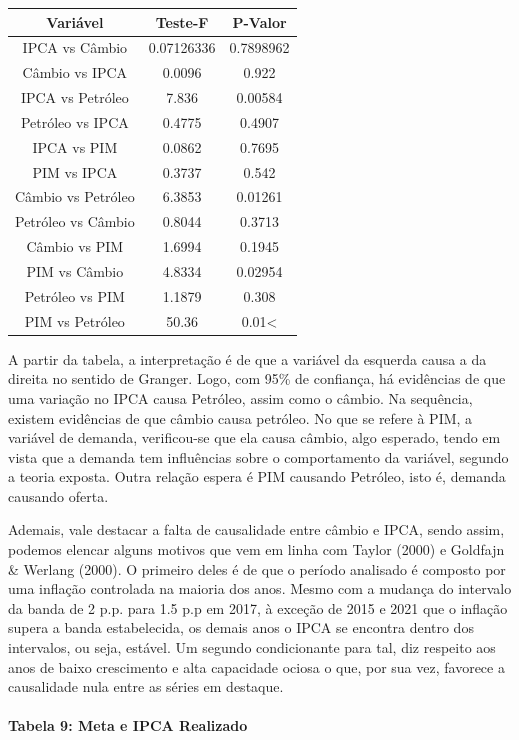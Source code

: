 \documentclass[12pt]{article}
\begin{document}
\begin{longtable}[]{@{}ccc@{}}
\toprule
Variável & Teste-F & P-Valor \\
\midrule
\endhead
IPCA vs Câmbio & 0.07126336 & 0.7898962 \\
Câmbio vs IPCA & 0.0096 & 0.922 \\
IPCA vs Petróleo & 7.836 & 0.00584 \\
Petróleo vs IPCA & 0.4775 & 0.4907 \\
IPCA vs PIM & 0.0862 & 0.7695 \\
PIM vs IPCA & 0.3737 & 0.542 \\
Câmbio vs Petróleo & 6.3853 & 0.01261 \\
Petróleo vs Câmbio & 0.8044 & 0.3713 \\
Câmbio vs PIM & 1.6994 & 0.1945 \\
PIM vs Câmbio & 4.8334 & 0.02954 \\
Petróleo vs PIM & 1.1879 & 0.308 \\
PIM vs Petróleo & 50.36 & 0.01\textless{} \\
\bottomrule
\end{longtable}

A partir da tabela, a interpretação é de que a variável da esquerda
causa a da direita no sentido de Granger. Logo, com 95\% de confiança,
há evidências de que uma variação no IPCA causa Petróleo, assim como o
câmbio. Na sequência, existem evidências de que câmbio causa petróleo.
No que se refere à PIM, a variável de demanda, verificou-se que ela
causa câmbio, algo esperado, tendo em vista que a demanda tem
influências sobre o comportamento da variável, segundo a teoria exposta.
Outra relação espera é PIM causando Petróleo, isto é, demanda causando
oferta.

Ademais, vale destacar a falta de causalidade entre câmbio e IPCA, sendo
assim, podemos elencar alguns motivos que vem em linha com Taylor (2000)
e Goldfajn \& Werlang (2000). O primeiro deles é de que o período
analisado é composto por uma inflação controlada na maioria dos anos.
Mesmo com a mudança do intervalo da banda de 2 p.p. para 1.5 p.p em
2017, à exceção de 2015 e 2021 que o inflação supera a banda
estabelecida, os demais anos o IPCA se encontra dentro dos intervalos,
ou seja, estável. Um segundo condicionante para tal, diz respeito aos
anos de baixo crescimento e alta capacidade ociosa o que, por sua vez,
favorece a causalidade nula entre as séries em destaque.

\hypertarget{tabela-9-meta-e-ipca-realizado}{%
\paragraph{Tabela 9: Meta e IPCA
Realizado}\label{tabela-9-meta-e-ipca-realizado}}
\end{document}

